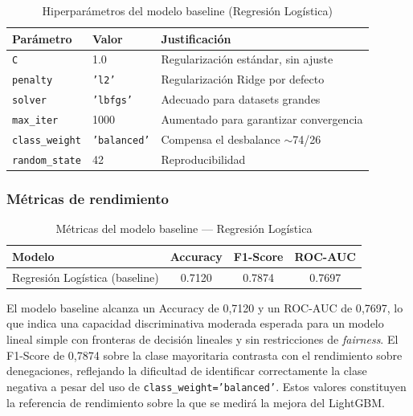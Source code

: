 \documentclass[11pt,a4paper]{article}
\begin{document}
\begin{table}[ht]
\centering
\caption{Hiperparámetros del modelo baseline (Regresión Logística)}
\label{tab:baseline_params}
\small
\begin{tabular}{@{}lll@{}}
\toprule
\textbf{Parámetro} & \textbf{Valor} & \textbf{Justificación} \\ \midrule
\texttt{C} & 1.0 & Regularización estándar, sin ajuste \\
\texttt{penalty} & \texttt{'l2'} & Regularización Ridge por defecto \\
\texttt{solver} & \texttt{'lbfgs'} & Adecuado para datasets grandes \\
\texttt{max\_iter} & 1000 & Aumentado para garantizar convergencia \\
\texttt{class\_weight} & \texttt{'balanced'} & Compensa el desbalance $\sim$74/26 \\
\texttt{random\_state} & 42 & Reproducibilidad \\
\bottomrule
\end{tabular}
\end{table}

\subsubsection{Métricas de rendimiento}

\begin{table}[ht]
\centering
\caption{Métricas del modelo baseline --- Regresión Logística}
\label{tab:baseline_metrics}
\small
\begin{tabular}{@{}lccc@{}}
\toprule
\textbf{Modelo} & \textbf{Accuracy} & \textbf{F1-Score} & \textbf{ROC-AUC} \\ \midrule
Regresión Logística (baseline) & 0.7120 & 0.7874 & 0.7697 \\
\bottomrule
\end{tabular}
\end{table}

El modelo baseline alcanza un Accuracy de 0{,}7120 y un ROC-AUC de 0{,}7697, lo que indica
una capacidad discriminativa moderada esperada para un modelo lineal simple con fronteras
de decisión lineales y sin restricciones de \textit{fairness}. El F1-Score de 0{,}7874 sobre la clase mayoritaria contrasta con el
rendimiento sobre denegaciones, reflejando la dificultad de identificar correctamente la clase
negativa a pesar del uso de \texttt{class\_weight='balanced'}. Estos valores constituyen la
referencia de rendimiento sobre la que se medirá la mejora del LightGBM.
\end{document}
